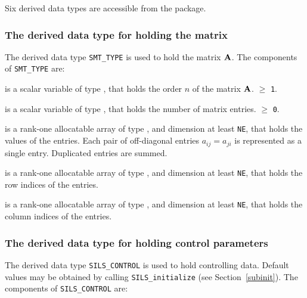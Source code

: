 \documentclass{galahad}
\newcommand{\packagename}{SILS}
\begin{document}
\galtypes
Six derived data types are accessible from the package.


\subsubsection{The derived data type for holding the matrix}\label{typeprob}
The derived data type {\tt SMT\_TYPE} is used to hold the matrix ${\mathbf{A}}$. 
The components of {\tt SMT\_TYPE} are:

\begin{description}

 is a scalar variable of type \integer, that holds
the order $n$ of the matrix  ${\mathbf{A}}$. 
 $\geq$ {\tt 1}. 

 is a scalar variable of type \integer, that holds the 
number of matrix entries.  
 $\geq$ {\tt 0}.

 is a rank-one allocatable array of type \realdp, 
and dimension at least {\tt NE}, that holds the values of the entries. 
Each pair of off-diagonal entries $a_{ij} = a_{ji} $ 
is represented as a single entry. Duplicated entries are summed. 

 is a rank-one allocatable array of type \integer, 
and dimension at least {\tt NE}, that holds the row indices of the entries. 

 is a rank-one allocatable array of type \integer, 
and dimension at least {\tt NE}, that holds the column indices of the entries. 

\end{description}


\subsubsection{The derived data type for holding control 
 parameters}\label{typecontrol}
The derived data type 
{\tt \packagename\_CONTROL} 
is used to hold controlling data. Default values may be obtained by calling 
{\tt \packagename\_initialize}
(see Section~\ref{subinit}). The components of 
{\tt \packagename\_CONTROL} 
are:
\end{document}
